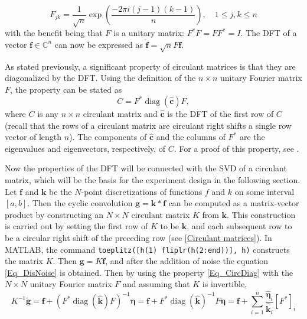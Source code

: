 \documentclass[12pt]{article}
\newcommand{\kcon}{k}
\newcommand{\fcon}{f}
\newcommand{\gdis}{\mathbf{g}}
\newcommand{\gnoise}{\widetilde{\mathbf{g}}}
\newcommand{\kdis}{\mathbf{k}}
\newcommand{\kmat}{K}	%
\newcommand{\fdis}{\mathbf{f}}
\newcommand{\ctrans}{*}	%
\newcommand{\diag}{\operatorname{diag}}
\newcommand{\noise}{\bm{\eta}}	%
\begin{document}
\begin{equation}
F_{jk} = \frac{1}{\sqrt{n}}\exp\left(\frac{-2\pi{i(j-1)(k-1)}}{n}\right), \quad 1 \leq j,k \leq n
\label{Eq_DFT-Matrix}
\end{equation}
with the benefit being that $F$ is a unitary matrix: $F^\ctrans{F} = FF^\ctrans = I$. The DFT of a vector $\mathbf{f}\in\mathbb{C}^n$ can now be expressed as $\widehat{\mathbf{f}} = \sqrt{n}F\mathbf{f}$. \par 
As stated previously, a significant property of circulant matrices is that they are diagonalized by the DFT. Using the definition of the $n \times n$ unitary Fourier matrix $F$, the property can be stated as
\begin{equation}
C = F^\ctrans\diag(\widehat{\mathbf{c}})F,
\label{Eq_CircDiag}
\end{equation}
where $C$ is any $n \times n$ circulant matrix and $\widehat{\mathbf{c}}$ is the DFT of the first row of $C$ (recall that the rows of a circulant matrix are circulant right shifts a single row vector of length $n$). The components of $\widehat{\mathbf{c}}$ and the columns of $F^\ctrans$ are the eigenvalues and eigenvectors, respectively, of $C$. For a proof of this property, see \cite{BoggessAlbert2001Afci}. \par
Now the properties of the DFT will be connected with the SVD of a circulant matrix, which will be the basis for the experiment design in the following section. Let $\fdis$ and $\kdis$ be the $N$-point discretizations of functions $\fcon$ and $\kcon$ on some interval $[a,b]$. Then the cyclic convolution $\gdis = \kdis * \fdis$ can be computed as a matrix-vector product by constructing an $N \times N$ circulant matrix $\kmat$ from $\kdis$. This construction is carried out by setting the first row of $\kmat$ to be $\kdis$, and each subsequent row to be a circular right shift of the preceding row (see \ref{Circulant matrices}). In MATLAB, the command \texttt{toeplitz([h(1) fliplr(h(2:end))], h)} constructs the matrix $\kmat$. Then $\gdis = \kmat\fdis$, and after the addition of noise the equation \eqref{Eq_DisNoise} is obtained. Then by using the property \eqref{Eq_CircDiag} with the $N \times N$ unitary Fourier matrix $F$ and assuming that $\kmat$ is invertible, 
\begin{equation}
\kmat^{-1}\gnoise = \fdis + (F^*\diag(\widehat{\kdis})F)^{-1}\noise = \fdis + F^*\diag(\widehat{\kdis})^{-1}F\noise = \fdis + \sum_{i = 1}^n \frac{\widehat{\noise}_i}{\widehat{\kdis}_i}[F^*]_i
\label{Eq_InvProdDFT}
\end{equation}
\end{document}
